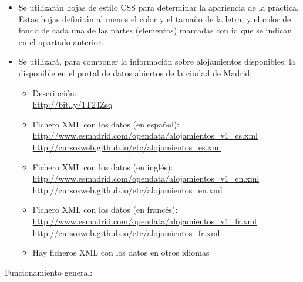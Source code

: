 \begin{itemize}
\item Se utilizarán hojas de estilo CSS para determinar la apariencia de la práctica. Estas hojas definirán al menos el color y el tamaño de la letra, y el color de fondo de cada una de las partes (elementos) marcadas con id que se indican en el apartado anterior.

\item Se utilizará, para componer la información sobre alojamientos disponibles, la disponible en el portal de datos abiertos de la ciudad de Madrid:

  \begin{itemize}
  \item Descripción: \\
    \url{http://bit.ly/1T24Zsq}
  \item Fichero XML con los datos (en español): \\
    \url{http://www.esmadrid.com/opendata/alojamientos_v1_es.xml} \\
    \url{http://cursosweb.github.io/etc/alojamientos_es.xml}
  \item Fichero XML con los datos (en inglés): \\
    \url{http://www.esmadrid.com/opendata/alojamientos_v1_en.xml} \\
    \url{http://cursosweb.github.io/etc/alojamientos_en.xml}
  \item Fichero XML con los datos (en francés): \\
    \url{http://www.esmadrid.com/opendata/alojamientos_v1_fr.xml} \\
    \url{http://cursosweb.github.io/etc/alojamientos_fr.xml}
  \item Hay ficheros XML con los datos en otros idiomas
  \end{itemize}
\end{itemize}

Funcionamiento general:

